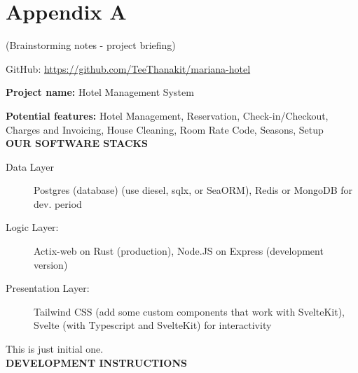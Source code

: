 %
%

\chapter{Appendix A}
\label{app:app01}

(Brainstorming notes - project briefing) 

GitHub: \href{https://github.com/TeeThanakit/mariana-hotel}{https://github.com/TeeThanakit/mariana-hotel}

\textbf{Project name:} Hotel Management System

\textbf{Potential features:} Hotel Management, Reservation, Check-in/Checkout, Charges and Invoicing, House Cleaning, Room Rate Code, Seasons, Setup\\

\textbf{OUR SOFTWARE STACKS}

\begin{description}
	\item[Data Layer] Postgres (database) (use diesel, sqlx, or SeaORM), Redis or MongoDB for dev. period
	\item[Logic Layer:] Actix-web on Rust (production), Node.JS on Express (development version)
	\item[Presentation Layer:] Tailwind CSS (add some custom components that work with SvelteKit), Svelte (with Typescript and SvelteKit) for interactivity
\end{description}

This is just initial one.\\

\textbf{DEVELOPMENT INSTRUCTIONS}

